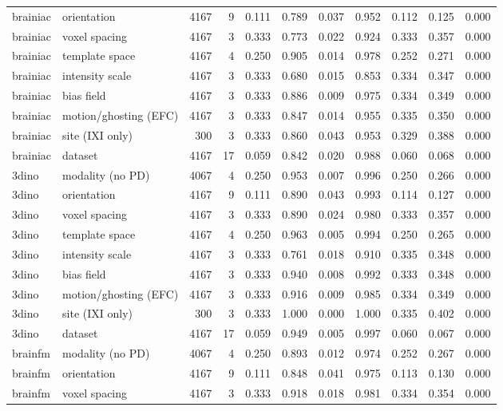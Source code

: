 \begin{tabular}{llrrrrrrrrr}
brainiac & orientation & 4167 & 9 & 0.111 & 0.789 & 0.037 & 0.952 & 0.112 & 0.125 & 0.000 \\
brainiac & voxel spacing & 4167 & 3 & 0.333 & 0.773 & 0.022 & 0.924 & 0.333 & 0.357 & 0.000 \\
brainiac & template space & 4167 & 4 & 0.250 & 0.905 & 0.014 & 0.978 & 0.252 & 0.271 & 0.000 \\
brainiac & intensity scale & 4167 & 3 & 0.333 & 0.680 & 0.015 & 0.853 & 0.334 & 0.347 & 0.000 \\
brainiac & bias field & 4167 & 3 & 0.333 & 0.886 & 0.009 & 0.975 & 0.334 & 0.349 & 0.000 \\
brainiac & motion/ghosting (EFC) & 4167 & 3 & 0.333 & 0.847 & 0.014 & 0.955 & 0.335 & 0.350 & 0.000 \\
brainiac & site (IXI only) & 300 & 3 & 0.333 & 0.860 & 0.043 & 0.953 & 0.329 & 0.388 & 0.000 \\
brainiac & dataset & 4167 & 17 & 0.059 & 0.842 & 0.020 & 0.988 & 0.060 & 0.068 & 0.000 \\
3dino & modality (no PD) & 4067 & 4 & 0.250 & 0.953 & 0.007 & 0.996 & 0.250 & 0.266 & 0.000 \\
3dino & orientation & 4167 & 9 & 0.111 & 0.890 & 0.043 & 0.993 & 0.114 & 0.127 & 0.000 \\
3dino & voxel spacing & 4167 & 3 & 0.333 & 0.890 & 0.024 & 0.980 & 0.333 & 0.357 & 0.000 \\
3dino & template space & 4167 & 4 & 0.250 & 0.963 & 0.005 & 0.994 & 0.250 & 0.265 & 0.000 \\
3dino & intensity scale & 4167 & 3 & 0.333 & 0.761 & 0.018 & 0.910 & 0.335 & 0.348 & 0.000 \\
3dino & bias field & 4167 & 3 & 0.333 & 0.940 & 0.008 & 0.992 & 0.333 & 0.348 & 0.000 \\
3dino & motion/ghosting (EFC) & 4167 & 3 & 0.333 & 0.916 & 0.009 & 0.985 & 0.334 & 0.349 & 0.000 \\
3dino & site (IXI only) & 300 & 3 & 0.333 & 1.000 & 0.000 & 1.000 & 0.335 & 0.402 & 0.000 \\
3dino & dataset & 4167 & 17 & 0.059 & 0.949 & 0.005 & 0.997 & 0.060 & 0.067 & 0.000 \\
brainfm & modality (no PD) & 4067 & 4 & 0.250 & 0.893 & 0.012 & 0.974 & 0.252 & 0.267 & 0.000 \\
brainfm & orientation & 4167 & 9 & 0.111 & 0.848 & 0.041 & 0.975 & 0.113 & 0.130 & 0.000 \\
brainfm & voxel spacing & 4167 & 3 & 0.333 & 0.918 & 0.018 & 0.981 & 0.334 & 0.354 & 0.000 \\

\end{tabular}
